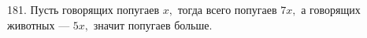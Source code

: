 181. Пусть говорящих попугаев $x,$ тогда всего попугаев $7x,$ а говорящих животных --- $5x,$ значит попугаев больше.\\

